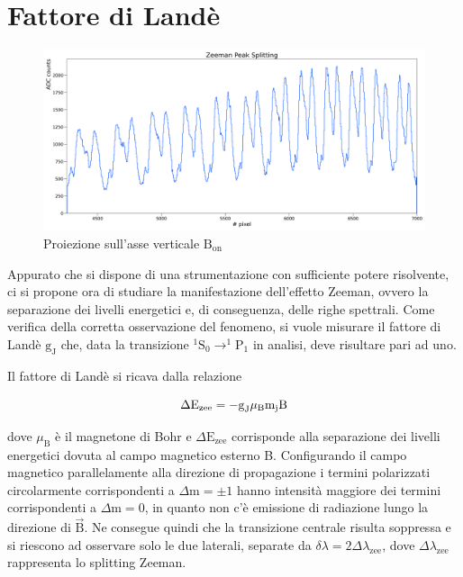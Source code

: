 \documentclass[twocolumn,10pt]{asme2ej}
\begin{document}
\vspace{-10pt}
\section{Fattore di Landè}\label{s:lande}

\begin{figure}
    \centering
    \includegraphics[width=\textwidth]{../Plots/Bon_Y_proj.png}
    \caption{Proiezione sull'asse verticale $\text{B}_{\text{on}}$}
    \label{i:spettro2d_Bon_ProjY}
\end{figure}

Appurato che si dispone di una strumentazione con sufficiente potere risolvente, ci si propone ora di studiare la
manifestazione dell'effetto Zeeman, ovvero la separazione dei livelli energetici e, di conseguenza, delle righe
spettrali. Come verifica della corretta osservazione del fenomeno, si vuole misurare il fattore di Landè
$\text{g}_{\text{J}}$ che, data la transizione $^1\text{S}_0 \rightarrow ^1\text{P}_1$ in analisi, deve risultare pari
ad uno.

Il fattore di Landè si ricava dalla relazione

\vspace{-15pt}
\begin{equation}
    \Delta \text{E}_{\text{zee}} = - \text{g}_{\text{J}} \mu_{\text{B}} \text{m}_{\text{j}} \text{B} 
    \label{e:gL}
\vspace{-5pt}
\end{equation}

\noindent dove $\mu_{\text{B}}$ è il magnetone di Bohr e $\Delta \text{E}_{\text{zee}}$ corrisponde alla separazione dei
livelli energetici dovuta al campo magnetico esterno B. Configurando il campo magnetico parallelamente alla direzione di
propagazione i termini polarizzati circolarmente corrispondenti a $\Delta \text{m} = \pm 1$ hanno intensità maggiore dei
termini corrispondenti a $\Delta \text{m} = 0$, in quanto non c'è emissione di radiazione lungo la direzione di
$\vec{\text{B}}$. Ne consegue quindi che la transizione centrale risulta soppressa e si riescono ad osservare solo le
due laterali, separate da $\delta\lambda = 2 \Delta\lambda_{\text{zee}}$, dove $\Delta\lambda_{\text{zee}}$ rappresenta
lo splitting Zeeman. 
\end{document}
